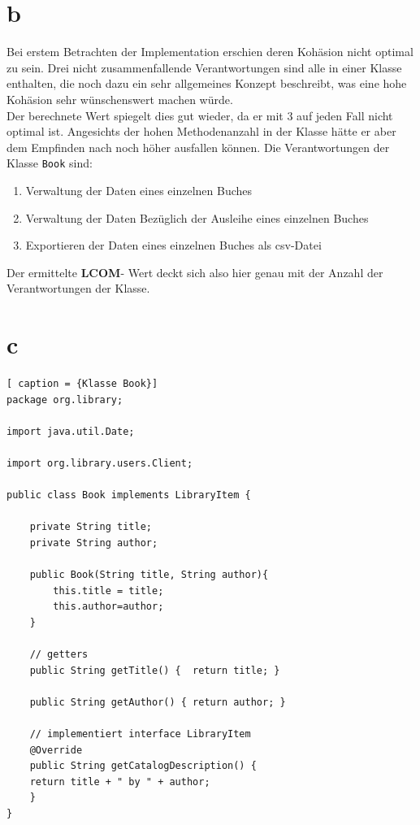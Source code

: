 \section*{b}
Bei erstem Betrachten der Implementation erschien deren Kohäsion nicht optimal zu sein. Drei nicht zusammenfallende Verantwortungen sind alle in einer Klasse enthalten, die noch dazu ein sehr allgemeines Konzept beschreibt, was eine hohe Kohäsion sehr wünschenswert machen würde.\\
Der berechnete Wert spiegelt dies gut wieder, da er mit 3 auf jeden Fall nicht optimal ist. Angesichts der hohen Methodenanzahl in der Klasse hätte er aber dem Empfinden nach noch höher ausfallen können.
Die Verantwortungen der Klasse \texttt{Book} sind:
\begin{enumerate}
	\item Verwaltung der Daten eines einzelnen Buches
	\item Verwaltung der Daten Bezüglich der Ausleihe eines einzelnen Buches
	\item Exportieren der Daten eines einzelnen Buches als csv-Datei
\end{enumerate}
 Der ermittelte \textbf{LCOM}- Wert deckt sich also hier genau mit der Anzahl der Verantwortungen der Klasse.
 
 
\section*{c}
\lstset{language=Java,
	showspaces=false,
	showtabs=false,
	breaklines=true,
	showstringspaces=false,
	breakatwhitespace=true,
}



\begin{lstlisting}[	caption = {Klasse Book}]
package org.library;

import java.util.Date;

import org.library.users.Client;

public class Book implements LibraryItem {
	
	private String title;
	private String author;
	
	public Book(String title, String author){
		this.title = title;
		this.author=author;
	}

	// getters
	public String getTitle() {  return title; }
	
	public String getAuthor() { return author; }

	// implementiert interface LibraryItem
	@Override
	public String getCatalogDescription() {
	return title + " by " + author;  
	}
}
\end{lstlisting}

